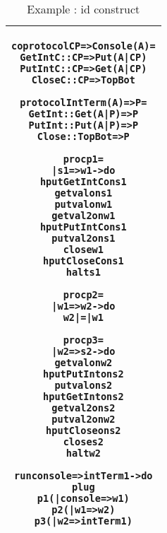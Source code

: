 \documentclass[11pt]{article}
\newcommand{\<}{\langle}
\renewcommand{\>}{\rangle}
\begin{document}
\begin{table}[h!]
\begin{center}
\begin{tabular}{|c|} \hline
\begin{minipage}{5in}
{
\begin{alltt}


      coprotocol CP => Console (A) =
          GetIntC   :: CP => Put (A|CP)  
          PutIntC   :: CP => Get (A|CP) 
          CloseC    :: CP => TopBot  

      protocol IntTerm (A) => P =
          GetInt   :: Get (A|P) => P 
          PutInt   :: Put (A|P) => P
          Close    :: TopBot    => P  

      proc p1 = 
        | s1 => w1 -> do 
             hput GetIntC on s1
             get val on s1
             put val on w1
             get val2 on w1
             hput PutIntC on s1
             put val2 on s1 
             close w1
             hput CloseC on s1
             halt s1

      proc p2 =
        | w1 => w2 -> do 
             w2 |=| w1 

      proc  p3 =
          | w2 => s2 -> do 
             get val on w2 
             hput PutInt on s2
             put val on s2
             hput GetInt on s2
             get val2 on s2
             put val2 on w2
             hput Close on s2
             close s2
             halt w2  


      run console => intTerm1 -> do 
          plug 
            p1 ( | console => w1)
            p2 ( | w1 => w2)
            p3 ( | w2 => intTerm1) 


\end{alltt}

} 
\end {minipage} 
\tabularnewline
\hline
\end{tabular}
\caption{Example : {\sf id} construct}
\label{Conc : idExample}
\end{center}
\end{table}
\end{document}
